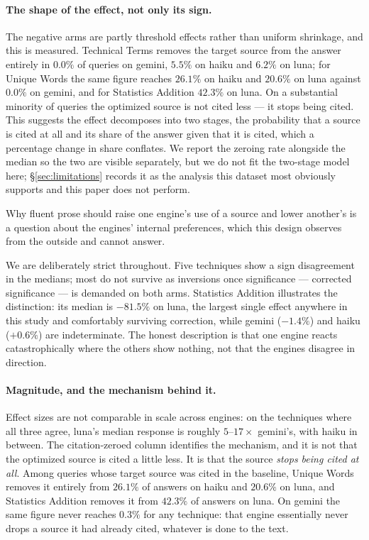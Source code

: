 \documentclass[11pt,a4paper]{article}
\begin{document}
\paragraph{The shape of the effect, not only its sign.} The negative arms
are partly threshold effects rather than uniform shrinkage, and this is
measured. Technical Terms removes the target source from the answer entirely
in $0.0\%$ of queries on gemini, $5.5\%$ on haiku and $6.2\%$ on luna; for
Unique Words the same figure reaches $26.1\%$ on haiku and $20.6\%$ on luna
against $0.0\%$ on gemini, and for Statistics Addition $42.3\%$ on luna. On a substantial minority of queries the optimized
source is not cited less --- it stops being cited. This suggests the effect
decomposes into two stages, the probability that a source is cited at all
and its share of the answer given that it is cited, which a percentage
change in share conflates. We report the zeroing rate alongside the median
so the two are visible separately, but we do not fit the two-stage model
here; \S\ref{sec:limitations} records it as the analysis this dataset most
obviously supports and this paper does not perform.

Why fluent prose should raise one engine's use of a source and lower
another's is a question about the engines' internal preferences, which this
design observes from the outside and cannot answer.

We are deliberately strict throughout. Five techniques show a sign
disagreement in the medians; most do not survive as inversions once
significance --- corrected significance --- is demanded on both arms.
Statistics Addition illustrates the distinction: its median is $-81.5\%$ on
luna, the largest single effect anywhere in this study and comfortably
surviving correction, while gemini ($-1.4\%$) and haiku ($+0.6\%$) are
indeterminate. The honest description is that one engine reacts
catastrophically where the others show nothing, not that the engines
disagree in direction.

\paragraph{Magnitude, and the mechanism behind it.} Effect sizes are not
comparable in scale across engines: on the techniques where all three agree,
luna's median response is roughly $5$--$17\times$ gemini's, with haiku in
between. The citation-zeroed column identifies the mechanism, and it is not
that the optimized source is cited a little less. It is that the source
\emph{stops being cited at all}. Among queries whose target source was cited
in the baseline, Unique Words removes it entirely from $26.1\%$ of answers on
haiku and $20.6\%$ on luna, and Statistics Addition removes it from $42.3\%$
of answers on luna. On gemini the same figure never reaches $0.3\%$ for any
technique: that engine essentially never drops a source it had already
cited, whatever is done to the text.
\end{document}
